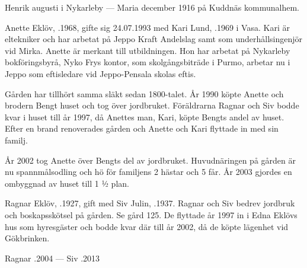 Henrik  augusti i Nykarleby  ---  Maria  december 1916 på Kuddnäs kommunalhem.



%



%
Anette Eklöv, .1968, gifte sig 24.07.1993 med Kari Lund, .1969 i Vasa. Kari är eltekniker och har arbetat på Jeppo Kraft Andelslag samt som underhållsingenjör vid Mirka. Anette är merkant till utbildningen. Hon 	har arbetat på Nykarleby bokföringsbyrå, Nyko Frys kontor, som skolgångsbiträde i Purmo, arbetar nu i Jeppo som eftisledare vid Jeppo-Pensala skolas eftis.
\begin{jhchildren}
  \item {}
  \item {}
  \item {}
\end{jhchildren}

Gården har tillhört samma släkt sedan 1800-talet. År 1990 köpte Anette och brodern Bengt huset och tog över jordbruket. Föräldrarna Ragnar och Siv bodde kvar i huset till år 1997, då Anettes man, Kari, köpte Bengts andel av huset. Efter en brand renoverades gården och Anette och Kari flyttade in med sin familj.

År 2002 tog Anette över Bengts del av jordbruket. Huvudnäringen på gården är nu spannmålsodling och hö för familjens 2 hästar och 5 får. År 2003 gjordes en ombyggnad av huset till 1 ½ plan.


%
Ragnar Eklöv, .1927, gift med Siv Julin, .1937. Ragnar och Siv bedrev jordbruk och boskapsskötsel på gården. Se gård 125. De flyttade år 1997 in i Edna Eklövs hus som hyresgäster och bodde kvar där till år 2002, då de köpte lägenhet vid Gökbrinken.

Ragnar .2004  ---  Siv .2013


%


